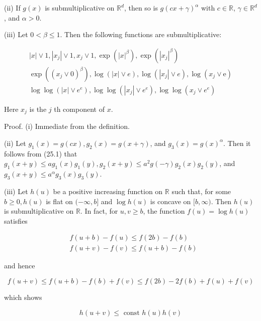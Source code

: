 \documentclass[a4paper,12pt]{article}
\begin{document}
                (ii) If $g(x)$ is submultiplicative on $\mathbb{R}^{d}$, then so is $g(c x+\gamma)^{\alpha}$ with $c \in \mathbb{R}$, $\gamma \in \mathbb{R}^{d}$, and $\alpha>0$.

                (iii) Let $0<\beta \leq 1$. Then the following functions are submultiplicative:

                $$
                    \begin{gathered}
                        |x| \vee 1,\left|x_{j}\right| \vee 1, x_{j} \vee 1, \exp \left(|x|^{\beta}\right), \exp \left(\left|x_{j}\right|^{\beta}\right) \\
                        \exp \left(\left(x_{j} \vee 0\right)^{\beta}\right), \log (|x| \vee e), \log \left(\left|x_{j}\right| \vee e\right), \log \left(x_{j} \vee \mathrm{e}\right) \\
                        \log \log \left(|x| \vee e^{e}\right), \log \log \left(\left|x_{j}\right| \vee e^{e}\right), \log \log \left(x_{j} \vee e^{e}\right)
                    \end{gathered}
                $$

                Here $x_{j}$ is the $j$ th component of $x$.

                Proof. (i) Immediate from the definition.

                (ii) Let $g_{1}(x)=g(c x), g_{2}(x)=g(x+\gamma)$, and $g_{3}(x)=g(x)^{\alpha}$. Then it follows from (25.1) that $g_{1}(x+y) \leq a g_{1}(x) g_{1}(y), g_{2}(x+y) \leq a^{2} g(-\gamma) g_{2}(x) g_{2}(y)$, and $g_{3}(x+y) \leq a^{\alpha} g_{3}(x) g_{3}(y)$.

                (iii) Let $h(u)$ be a positive increasing function on $\mathbb{R}$ such that, for some $b \geq 0, h(u)$ is flat on $(-\infty, b]$ and $\log h(u)$ is concave on $[b, \infty)$. Then $h(u)$ is submultiplicative on $\mathbb{R}$. In fact, for $u, v \geq b$, the function $f(u)=\log h(u)$ satisfies

$$
    \begin{aligned}
         & f(u+b)-f(u) \leq f(2 b)-f(b) \\
         & f(u+v)-f(v) \leq f(u+b)-f(b)
    \end{aligned}
$$

and hence

$$
    f(u+v) \leq f(u+b)-f(b)+f(v) \leq f(2 b)-2 f(b)+f(u)+f(v)
$$

which shows


\begin{equation*}
    h(u+v) \leq \text { const } h(u) h(v) \tag{25.2}
\end{equation*}
\end{document}
